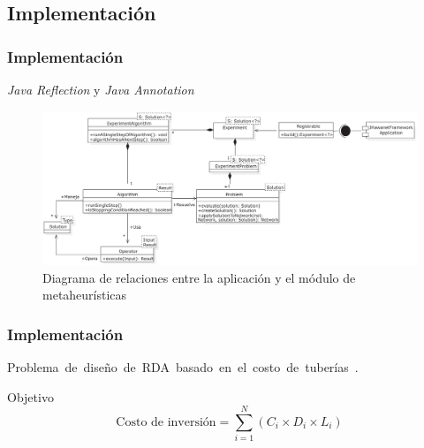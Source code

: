 \documentclass[9pt]{beamer}
\begin{document}



    \subsection{Implementación}

    \begin{frame}
        \frametitle{Implementación}                       
        \textit{Java Reflection} y \textit{Java Annotation}
        \begin{figure}
            \includegraphics[width=\textwidth]{assets/InterfazHumano-app.eps}
            \caption{Diagrama de relaciones entre la aplicación y el módulo de metaheurísticas}
        \end{figure}

    \end{frame}

    \begin{frame}
        \frametitle{Implementación}                       
        Problema de diseño de RDA basado en el costo de tuberías~\citet{Pereyra2017}.

        \begin{block}{Objetivo}
            \begin{equation*}
                \text{Costo de inversión} = \sum_{i=1}^{N} (C_i \times D_i \times L_i)
            \end{equation*}
        \end{block}
        
    \end{frame}
\end{document}
